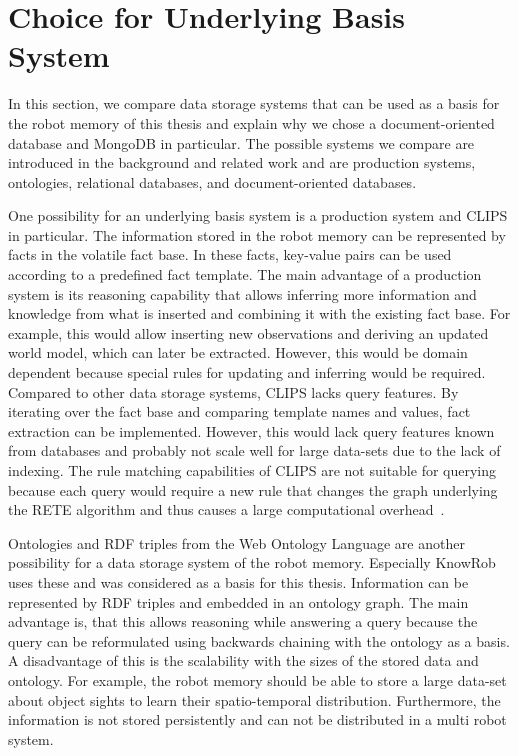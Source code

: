 \section{Choice for Underlying Basis System}
\label{sec:basis-representation}
In this section, we compare data storage systems that can be used as a
basis for the robot memory of this thesis and explain why we chose a
document-oriented database and MongoDB in particular. The possible
systems we compare are introduced in
the background and related work and are production systems,
ontologies, relational databases, and document-oriented databases.

One possibility for an underlying basis system is a production system
and CLIPS in particular. The information stored in the robot memory
can be represented by facts in the volatile fact base. In these facts,
key-value pairs can be used according to a predefined fact
template. The main advantage of a production system is its reasoning
capability that allows inferring more information and knowledge from
what is inserted and combining it with the existing fact base. For
example, this would allow inserting new observations and deriving an
updated world model, which can later be extracted. However,
this would be domain dependent because special rules for updating and inferring
would be required. Compared to other data storage systems,
CLIPS lacks query features. By iterating over the fact base and
comparing template names and values, fact extraction can be
implemented. However, this would lack query features known from
databases and probably not scale well for large data-sets due to the
lack of indexing. The rule matching capabilities of CLIPS are not
suitable for querying because each query would require a new rule that
changes the graph underlying the RETE algorithm and thus causes a
large computational overhead~\cite{Rete}.

Ontologies and RDF triples from the Web Ontology Language are another
possibility for a data storage system of the robot memory. Especially
KnowRob uses these and was considered as a basis for this
thesis. Information can be represented by RDF triples and embedded in
an ontology graph. The main advantage is, that this allows reasoning
while answering a query because the query can be reformulated using
backwards chaining with the ontology as a basis. A disadvantage of this is
the scalability with the sizes of the stored data and ontology. For
example, the robot memory should be able to store a large data-set
about object sights to learn their spatio-temporal
distribution. Furthermore, the information is not stored persistently
and can not be distributed in a multi robot system.

